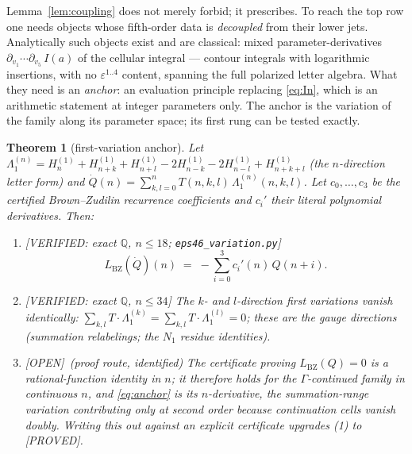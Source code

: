 \documentclass[11pt,reqno]{amsart}
\theoremstyle{plain}
\newtheorem{theorem}{Theorem}[section]
\theoremstyle{definition}
\theoremstyle{remark}
\newcommand{\Q}{\mathbb{Q}}
\newcommand{\HH}[2]{H^{(#1)}_{#2}}
\newcommand{\Lbz}{L_{\mathrm{BZ}}}
\newcommand{\Proved}{\textup{\textsf{[PROVED]}}}
\newcommand{\VerifiedR}[1]{\textup{\textsf{[VERIFIED: #1]}}}
\newcommand{\Open}{\textup{\textsf{[OPEN]}}}
\begin{document}
Lemma~\ref{lem:coupling} does not merely forbid; it prescribes. To reach the
top row one needs objects whose fifth-order data is \emph{decoupled} from
their lower jets. Analytically such objects exist and are classical: mixed
parameter-derivatives
$\partial_{v_1}\!\cdots\partial_{v_5}\,I(a)$ of the cellular integral ---
contour integrals with logarithmic insertions, with no
$\varepsilon^{1..4}$ content, spanning the full polarized letter algebra.
What they need is an \emph{anchor}: an evaluation principle replacing
\eqref{eq:In}, which is an arithmetic statement at integer parameters only.
The anchor is the variation of the family along its parameter space; its
first rung can be tested exactly.

\begin{theorem}[first-variation anchor]\label{thm:anchor}
Let $\Lambda_1^{(n)}=\HH1n+\HH1{n+k}+\HH1{n+l}-2\HH1{n-k}-2\HH1{n-l}
+\HH1{n+k+l}$ (the $n$-direction letter form) and
$\dot Q(n)=\sum_{k,l=0}^nT(n,k,l)\,\Lambda_1^{(n)}(n,k,l)$. Let
$c_0,\dots,c_3$ be the certified Brown--Zudilin recurrence coefficients and
$c_i'$ their literal polynomial derivatives. Then:
\begin{enumerate}[leftmargin=2em]
\item \VerifiedR{exact $\Q$, $n\le18$; \texttt{eps46\_variation.py}}
\begin{equation}\label{eq:anchor}
\Lbz(\dot Q)(n)\;=\;-\sum_{i=0}^{3}c_i'(n)\,Q(n+i).
\end{equation}
\item \VerifiedR{exact $\Q$, $n\le34$} The $k$- and $l$-direction first
variations vanish identically:
$\sum_{k,l}T\cdot\Lambda_1^{(k)}=\sum_{k,l}T\cdot\Lambda_1^{(l)}=0$; these
are the gauge directions (summation relabelings; the $N_1$ residue
identities).
\item \Open\ (proof route, identified) The certificate proving
$\Lbz(Q)=0$ is a rational-function identity in $n$; it therefore holds for
the $\Gamma$-continued family in continuous $n$, and \eqref{eq:anchor} is
its $n$-derivative, the summation-range variation contributing only at
second order because continuation cells vanish doubly. Writing this out
against an explicit certificate upgrades (1) to \Proved.
\end{enumerate}
\end{theorem}
\end{document}
